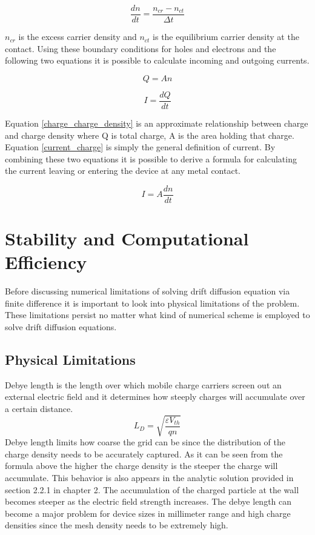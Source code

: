 \begin{doublespace}
\begin{equation}
\frac{dn}{dt}=\frac{n_{cr}-n_{ct}}{\Delta t}
\end{equation}

$n_{cr}$ is the excess carrier density and $n_{ct}$ is the equilibrium carrier density at the contact. Using these boundary conditions for holes and electrons and the following two equations it is possible to calculate incoming and outgoing currents. 

\begin{equation}
Q=An
\label{charge_charge_density}
\end{equation} 

\begin{equation}
I=\frac{dQ}{dt}
\label{current_charge}
\end{equation} 
 

Equation \ref{charge_charge_density} is an approximate relationship between charge and charge density where Q is total charge, A is the area holding that charge. Equation \ref{current_charge} is simply the general definition of current. By combining these two equations it is possible to derive a formula for calculating the current leaving or entering the device at any metal contact.

\begin{equation}
I=A \frac{dn}{dt}
\label{current_charge_density}
\end{equation}


\section{Stability and Computational Efficiency}
Before discussing numerical limitations of solving drift diffusion equation via finite difference it is important to look into physical limitations of the problem. These limitations persist no matter what kind of numerical scheme is employed to solve drift diffusion equations.

\subsection{Physical Limitations}
Debye length is the length over which mobile charge carriers screen out an external electric field and it determines how steeply charges will accumulate over a certain distance.
\begin{equation}
L_D=\sqrt{\frac{\varepsilon V_{th}}{q n}}
\label{debye}
\end{equation}
Debye length limits how coarse the grid can be since the distribution of the charge density needs to be accurately captured. As it can be seen from the formula above the higher the charge density is the steeper the charge will accumulate. This behavior is also appears in the analytic solution provided in section 2.2.1 in chapter 2. The accumulation of the charged particle at the wall becomes steeper as the electric field strength increases. The debye length can become a major problem for device sizes in millimeter range and high charge densities since the mesh density needs to be extremely high.


\end{doublespace}
